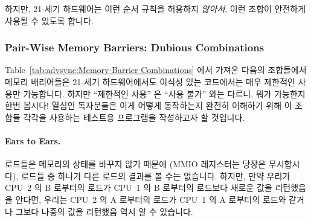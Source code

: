 	하지만, 21-세기 하드웨어는 이런 순서 규칙을 허용하지 \emph{않아서},
	이런 조합이 안전하게 사용될 수 있도록 합니다.

\subsubsection{Pair-Wise Memory Barriers: Dubious Combinations}

Table~\ref{tab:advsync:Memory-Barrier Combinations} 에서 가져온 다음의
조합들에서 메모리 배리어들은 21-세기 하드웨어에서도 이식성 있는 코드에서는 매우
제한적인 사용만 가능합니다. 
하지만 ``제한적인 사용'' 은 ``사용 불가'' 와는 다르니, 뭐가 가능한지 한번
봅시다!
열심인 독자분들은 이게 어떻게 동작하는지 완전히 이해하기 위해 이 조합들 각각을
사용하는 테스트용 프로그램을 작성하고자 할 것입니다.

\paragraph{Ears to Ears.}
	로드들은 메모리의 상태를 바꾸지 않기 때문에 (MMIO 레지스터는 당장은
	무시합시다), 로드들 중 하나가 다른 로드의 결과를 볼 수는 없습니다.
	하지만, 만약 우리가 CPU~2 의 B 로부터의 로드가 CPU~1 의 B 로부터의
	로드보다 새로운 값을 리턴했음을 안다면, 우리는 CPU~2 의 A 로부터의
	로드가 CPU~1 의 A 로부터의 로드와 같거나 그보다 나중의 값을 리턴했음
	역시 알 수 있습니다.


